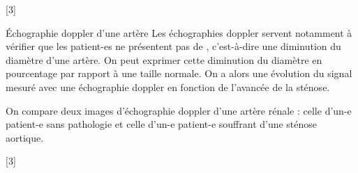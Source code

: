 [3]


\begin{doc}{Échographie doppler d'une artère}
  Les échographies doppler servent notamment à vérifier que les patient-es ne présentent pas de , c'est-à-dire une diminution du diamètre d'une artère.
  On peut exprimer cette diminution du diamètre en pourcentage par rapport à une taille normale.
  On a alors une évolution du signal mesuré avec une échographie doppler en fonction de l'avancée de la sténose.
  \begin{center}
    
  \end{center}

  On compare deux images d'échographie doppler d'une artère rénale : celle d'un-e patient-e sans pathologie et celle d'un-e patient-e souffrant d'une sténose aortique.
  
  \begin{center}
    
  \end{center}
\end{doc}


[3]